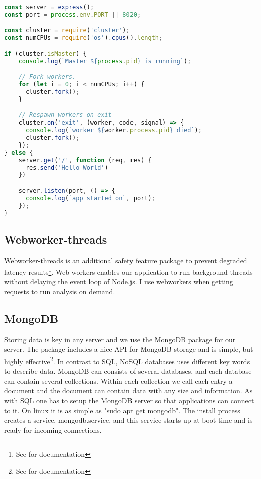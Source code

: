 \documentclass[USenglish]{ifimaster}  %
\begin{document}
\begin{lstlisting}[caption={Express setup with cluster},label={code:cluster},language=JavaScript]
const server = express();
const port = process.env.PORT || 8020;

const cluster = require('cluster');
const numCPUs = require('os').cpus().length;

if (cluster.isMaster) {
    console.log(`Master ${process.pid} is running`);

    // Fork workers.
    for (let i = 0; i < numCPUs; i++) {
      cluster.fork();
    }

    // Respawn workers on exit
    cluster.on('exit', (worker, code, signal) => {
      console.log(`worker ${worker.process.pid} died`);
      cluster.fork();
    });
} else {
    server.get('/', function (req, res) {
      res.send('Hello World')
    })

    server.listen(port, () => {
      console.log(`app started on`, port);
    });
}
\end{lstlisting}

\subsection{Webworker-threads}
Webworker-threads is an additional safety feature package to prevent degraded latency results\footnote{See \cite{npm:webworkers} for documentation}. Web workers enables our application to run background threads without delaying the event loop of Node.js. I use webworkers when getting requests to run analysis on demand.

\subsection{MongoDB} \label{subparagraph:mongodb}
Storing data is key in any server and we use the MongoDB package for our server. The package includes a nice API for MongoDB storage and is simple, but highly effective\footnote{See \cite{npm:mongodb} for documentation}. In contrast to SQL, NoSQL databases uses different key words to describe data. MongoDB can consists of several databases, and each database can contain several collections. Within each collection we call each entry a document and the document can contain data with any size and information. As with SQL one has to setup the MongoDB server so that applications can connect to it. On linux it is as simple as "sudo apt get mongodb". The install process creates a service, mongodb.service, and this service starts up at boot time and is ready for incoming connections.
\end{document}
